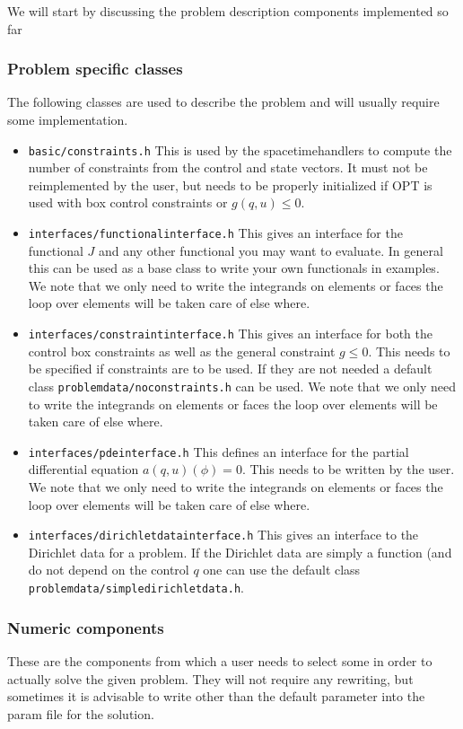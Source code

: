 We will start by discussing the problem description components implemented so far

\subsubsection{Problem specific classes}
The following classes are used to describe the problem and will usually require 
some implementation.

\begin{itemize}
  \item {\tt basic/constraints.h} This is used by the spacetimehandlers to 
    compute the number of constraints from the control and state vectors. 
    It must not be reimplemented by the user, but needs to be properly 
    initialized if OPT is used with box control constraints or $g(q,u) \le 0$.
  \item {\tt interfaces/functionalinterface.h} This gives an interface 
    for the functional $J$ and any other functional you may want to evaluate.
    In general this can be used as a base class to write your own functionals 
    in examples. We note that we only need to write the integrands on 
    elements or faces the loop over elements will be taken care of else where.
  \item {\tt interfaces/constraintinterface.h} This gives an interface for both 
    the control box constraints as well as the general constraint $g \le 0$. This 
    needs to be specified if constraints are to be used. If they are not needed 
    a default class {\tt problemdata/noconstraints.h} can be used. We note that we only 
    need to write the integrands on 
    elements or faces the loop over elements will be taken care of else where.
  \item {\tt interfaces/pdeinterface.h} This defines an interface for the 
    partial differential equation $a(q,u)(\phi) = 0$. This needs to be written
    by the user. We note that we only need to write the integrands on 
    elements or faces the loop over elements will be taken care of else where.
  \item {\tt interfaces/dirichletdatainterface.h} This gives an interface to the 
    Dirichlet data for a problem. If the Dirichlet data are simply a function 
    (and do not depend on the control $q$ one can use the default class
    {\tt problemdata/simpledirichletdata.h}.
\end{itemize}

\subsubsection{Numeric components}
These are the components from which a user needs to select some in order to actually 
solve the given problem. They will not require any rewriting, but sometimes it is 
advisable to write other than the default parameter into the param file for the 
solution.

